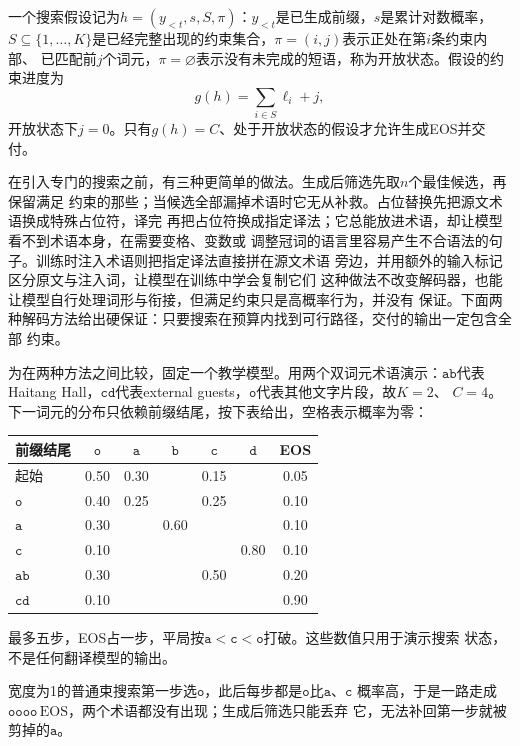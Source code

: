一个搜索假设记为$h=(y_{<t},s,S,\pi)$：$y_{<t}$是已生成前缀，$s$是累计对数概率，
$S\subseteq\{1,\ldots,K\}$是已经完整出现的约束集合，$\pi=(i,j)$表示正处在第$i$条约束内部、
已匹配前$j$个词元，$\pi=\varnothing$表示没有未完成的短语，称为开放状态。假设的约束进度为
\[
  g(h)=\sum_{i\in S}\ell_i+j,
\]
开放状态下$j=0$。只有$g(h)=C$、处于开放状态的假设才允许生成EOS并交付。

在引入专门的搜索之前，有三种更简单的做法。生成后筛选先取$n$个最佳候选，再保留满足
约束的那些；当候选全部漏掉术语时它无从补救。占位替换先把源文术语换成特殊占位符，译完
再把占位符换成指定译法；它总能放进术语，却让模型看不到术语本身，在需要变格、变数或
调整冠词的语言里容易产生不合语法的句子。训练时注入术语则把指定译法直接拼在源文术语
旁边，并用额外的输入标记区分原文与注入词，让模型在训练中学会复制它们
这种做法不改变解码器，也能让模型自行处理词形与衔接，但满足约束只是高概率行为，并没有
保证。下面两种解码方法给出硬保证：只要搜索在预算内找到可行路径，交付的输出一定包含全部
约束。

为在两种方法之间比较，固定一个教学模型。用两个双词元术语演示：$\mathtt{ab}$代表
Haitang Hall，$\mathtt{cd}$代表external guests，$\mathtt{o}$代表其他文字片段，故$K=2$、
$C=4$。下一词元的分布只依赖前缀结尾，按下表给出，空格表示概率为零：
\begin{center}
  \small
  \begin{tabular}{@{}lcccccc@{}}
    \toprule
    前缀结尾 & $\mathtt o$ & $\mathtt a$ & $\mathtt b$ & $\mathtt c$ & $\mathtt d$ & EOS\\
    \midrule
    起始 & 0.50 & 0.30 & & 0.15 & & 0.05\\
    $\mathtt o$ & 0.40 & 0.25 & & 0.25 & & 0.10\\
    $\mathtt a$ & 0.30 & & 0.60 & & & 0.10\\
    $\mathtt c$ & 0.10 & & & & 0.80 & 0.10\\
    $\mathtt{ab}$ & 0.30 & & & 0.50 & & 0.20\\
    $\mathtt{cd}$ & 0.10 & & & & & 0.90\\
    \bottomrule
  \end{tabular}
\end{center}
最多五步，EOS占一步，平局按$\mathtt a<\mathtt c<\mathtt o$打破。这些数值只用于演示搜索
状态，不是任何翻译模型的输出。

宽度为1的普通束搜索第一步选$\mathtt o$，此后每步都是$\mathtt o$比$\mathtt a$、$\mathtt c$
概率高，于是一路走成$\mathtt{oooo}\,\mathrm{EOS}$，两个术语都没有出现；生成后筛选只能丢弃
它，无法补回第一步就被剪掉的$\mathtt a$。

